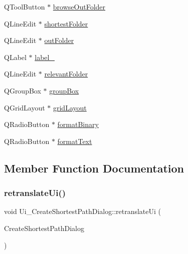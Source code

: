 \begin{DoxyCompactItemize}
Q\+Tool\+Button $\ast$ \mbox{\hyperlink{class_ui___create_shortest_path_dialog_ad7ad3b98fd545f24d036bb2c81267ef4}{browse\+Out\+Folder}}
\item 
Q\+Line\+Edit $\ast$ \mbox{\hyperlink{class_ui___create_shortest_path_dialog_a25025d566d9d877ac86fb97c4bab2522}{shortest\+Folder}}
\item 
Q\+Line\+Edit $\ast$ \mbox{\hyperlink{class_ui___create_shortest_path_dialog_acd3377306b9c5498b961c00c3a9539ad}{out\+Folder}}
\item 
Q\+Label $\ast$ \mbox{\hyperlink{class_ui___create_shortest_path_dialog_aa05e8291ce504c7c788110a78fdda607}{label\+\_}}
\item 
Q\+Line\+Edit $\ast$ \mbox{\hyperlink{class_ui___create_shortest_path_dialog_acf347bec8d3831c1e60a888d189b77e8}{relevant\+Folder}}
\item 
Q\+Group\+Box $\ast$ \mbox{\hyperlink{class_ui___create_shortest_path_dialog_a353c8daf1d511e0c2952ee07abb21291}{group\+Box}}
\item 
Q\+Grid\+Layout $\ast$ \mbox{\hyperlink{class_ui___create_shortest_path_dialog_af69f27b48a1d6fed8338f2f010ea7800}{grid\+Layout}}
\item 
Q\+Radio\+Button $\ast$ \mbox{\hyperlink{class_ui___create_shortest_path_dialog_afa83aa2f9aceb3efcfeb23809f9e6fed}{format\+Binary}}
\item 
Q\+Radio\+Button $\ast$ \mbox{\hyperlink{class_ui___create_shortest_path_dialog_aaf89985877dd25eaf9664907ac48ef3e}{format\+Text}}
\end{DoxyCompactItemize}


\subsection{Member Function Documentation}
\mbox{\label{class_ui___create_shortest_path_dialog_a0687dd5f557e43cecca4aba0be7eb720}} 
\subsubsection{\texorpdfstring{retranslateUi()}{retranslateUi()}}
{\footnotesize\ttfamily void Ui\+\_\+\+Create\+Shortest\+Path\+Dialog\+::retranslate\+Ui (\begin{DoxyParamCaption}\item[{Q\+Dialog $\ast$}]{Create\+Shortest\+Path\+Dialog }\end{DoxyParamCaption})\hspace{0.3cm}{\ttfamily [inline]}}

